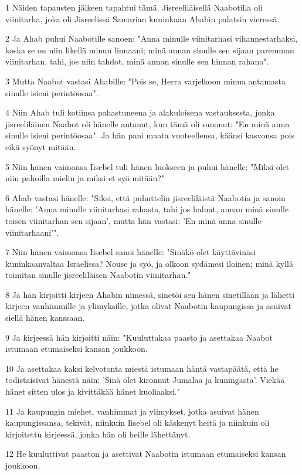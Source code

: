 \par 1 Näiden tapausten jälkeen tapahtui tämä. Jisreeliläisellä Naabotilla oli viinitarha, joka oli Jisreelissä Samarian kuninkaan Ahabin palatsin vieressä.
\par 2 Ja Ahab puhui Naabotille sanoen: "Anna minulle viinitarhasi vihannestarhaksi, koska se on niin likellä minun linnaani; minä annan sinulle sen sijaan paremman viinitarhan, tahi, jos niin tahdot, minä annan sinulle sen hinnan rahana".
\par 3 Mutta Naabot vastasi Ahabille: "Pois se, Herra varjelkoon minua antamasta sinulle isieni perintöosaa".
\par 4 Niin Ahab tuli kotiinsa pahastuneena ja alakuloisena vastauksesta, jonka jisreeliläinen Naabot oli hänelle antanut, kun tämä oli sanonut: "En minä anna sinulle isieni perintöosaa". Ja hän pani maata vuoteellensa, käänsi kasvonsa pois eikä syönyt mitään.
\par 5 Niin hänen vaimonsa Iisebel tuli hänen luokseen ja puhui hänelle: "Miksi olet niin pahoilla mielin ja miksi et syö mitään?"
\par 6 Ahab vastasi hänelle: "Siksi, että puhuttelin jisreeliläistä Naabotia ja sanoin hänelle: 'Anna minulle viinitarhasi rahasta, tahi jos haluat, annan minä sinulle toisen viinitarhan sen sijaan', mutta hän vastasi: 'En minä anna sinulle viinitarhaani'".
\par 7 Niin hänen vaimonsa Iisebel sanoi hänelle: "Sinäkö olet käyttävinäsi kuninkaanvaltaa Israelissa? Nouse ja syö, ja olkoon sydämesi iloinen; minä kyllä toimitan sinulle jisreeliläisen Naabotin viinitarhan."
\par 8 Ja hän kirjoitti kirjeen Ahabin nimessä, sinetöi sen hänen sinetillään ja lähetti kirjeen vanhimmille ja ylimyksille, jotka olivat Naabotin kaupungissa ja asuivat siellä hänen kanssaan.
\par 9 Ja kirjeessä hän kirjoitti näin: "Kuuluttakaa paasto ja asettakaa Naabot istumaan etumaiseksi kansan joukkoon.
\par 10 Ja asettakaa kaksi kelvotonta miestä istumaan häntä vastapäätä, että he todistaisivat hänestä näin: 'Sinä olet kironnut Jumalaa ja kuningasta'. Viekää hänet sitten ulos ja kivittäkää hänet kuoliaaksi."
\par 11 Ja kaupungin miehet, vanhimmat ja ylimykset, jotka asuivat hänen kaupungissansa, tekivät, niinkuin Iisebel oli käskenyt heitä ja niinkuin oli kirjoitettu kirjeessä, jonka hän oli heille lähettänyt.
\par 12 He kuuluttivat paaston ja asettivat Naabotin istumaan etumaiseksi kansan joukkoon.
